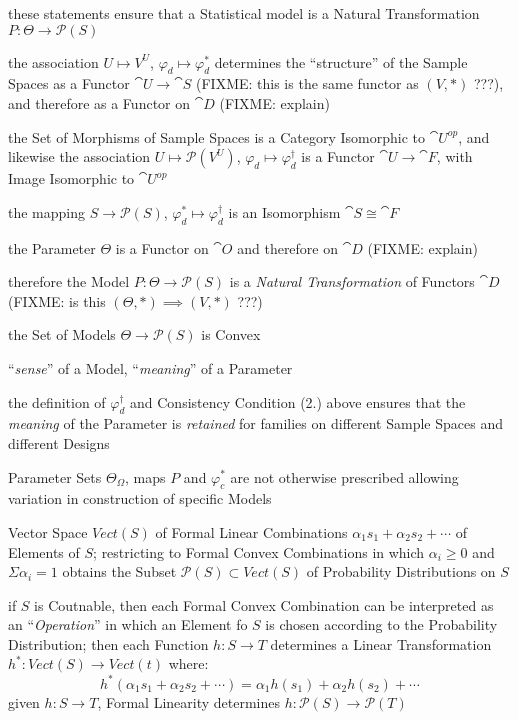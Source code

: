 these statements ensure that a Statistical model is a Natural Transformation
$P : \Theta \to \mathcal{P}(S)$

the association $U \mapsto V^U$, $\varphi_d \mapsto \varphi_d^*$ determines the
``structure'' of the Sample Spaces as a Functor $\cat{U} \to \cat{S}$ (FIXME:
this is the same functor as $(V, *)$ ???), and therefore as a Functor on
$\cat{D}$ (FIXME: explain)

the Set of Morphisms of Sample Spaces is a Category Isomorphic to
$\cat{U}^{op}$, and likewise the association $U \mapsto \mathcal{P}(V^U)$,
$\varphi_d \mapsto \varphi_d^\dagger$ is a Functor $\cat{U} \to \cat{F}$,
with Image Isomorphic to $\cat{U}^{op}$

the mapping $S \to \mathcal{P}(S)$, $\varphi_d^* \mapsto \varphi_d^\dagger$ is
an Isomorphism $\cat{S} \cong \cat{F}$

the Parameter $\Theta$ is a Functor on $\cat{O}$ and therefore on $\cat{D}$
(FIXME: explain)

therefore the Model $P : \Theta \to \mathcal{P}(S)$ is a \emph{Natural
  Transformation} of Functors $\cat{D}$ (FIXME: is this
$(\Theta, *) \implies (V, *)$ ???)

the Set of Models $\Theta \to \mathcal{P}(S)$ is Convex

``\emph{sense}'' of a Model, ``\emph{meaning}'' of a Parameter

the definition of $\varphi_d^\dagger$ and Consistency Condition (2.) above
ensures that the \emph{meaning} of the Parameter is \emph{retained} for families
on different Sample Spaces and different Designs

Parameter Sets $\Theta_\Omega$, maps $P$ and $\varphi_c^*$ are not otherwise
prescribed allowing variation in construction of specific Models

Vector Space $Vect(S)$ of Formal Linear Combinations
$\alpha_1 s_1 + \alpha_2 s_2 + \cdots$ of Elements of $S$; restricting to Formal
Convex Combinations in which $\alpha_i \geq 0$ and $\Sigma \alpha_i = 1$ obtains
the Subset $\mathcal{P}(S) \subset Vect(S)$ of Probability Distributions on $S$

if $S$ is Coutnable, then each Formal Convex Combination can be interpreted as
an ``\emph{Operation}'' in which an Element fo $S$ is chosen according to the
Probability Distribution; then each Function $h : S \to T$ determines a Linear
Transformation $h^* : Vect(S) \to Vect(t)$ where:
\[
  h^*(\alpha_1 s_1 + \alpha_2 s_2 + \cdots) =
    \alpha_1 h(s_1) + \alpha_2 h(s_2) + \cdots
\]
given $h : S \to T$, Formal Linearity determines
$h : \mathcal{P}(S) \to \mathcal{P}(T)$

